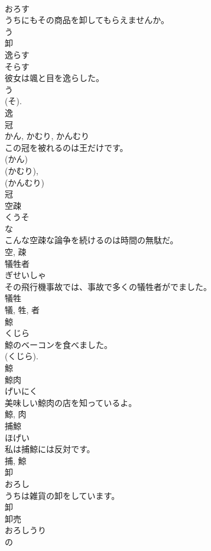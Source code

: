 \documentclass[8pt]{extreport}
\begin{document}
\begin{CJK}{UTF8}{min}
\\	おろす	
\\	うちにもその商品を卸してもらえませんか。	
\\	う 
\\	卸	
\\	逸らす	
\\	そらす	
\\	彼女は颯と目を逸らした。	
\\	う 
\\	(そ). 
\\	逸	
\\	冠	
\\	かん, かむり, かんむり	
\\	この冠を被れるのは王だけです。	
\\	(かん) 
\\	(かむり), 
\\	(かんむり) 
\\	冠	
\\	空疎	
\\	くうそ	
\\	な 
\\	こんな空疎な論争を続けるのは時間の無駄だ。	
\\	空, 疎	
\\	犠牲者	
\\	ぎせいしゃ	
\\	その飛行機事故では、事故で多くの犠牲者がでました。	
\\	犠牲 
\\	犠, 牲, 者	
\\	鯨	
\\	くじら	
\\	鯨のベーコンを食べました。	
\\	(くじら). 
\\	鯨	
\\	鯨肉	
\\	げいにく	
\\	美味しい鯨肉の店を知っているよ。	
\\	鯨, 肉	
\\	捕鯨	
\\	ほげい	
\\	私は捕鯨には反対です。	
\\	捕, 鯨	
\\	卸	
\\	おろし	
\\	うちは雑貨の卸をしています。	
\\	卸	
\\	卸売	
\\	おろしうり	
\\	の 

\end{CJK}
\end{document}
